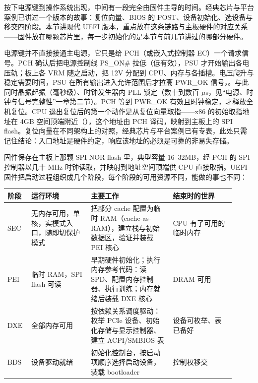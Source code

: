 
按下电源键到操作系统出现，中间有一段完全由固件主导的时间。经典芯片与平台案例已讲过一个版本的故事：复位向量、BIOS 的 POST、设备初始化、选设备与移交四阶段。本节讲现代 UEFI 版本，重点放在这条链路与主板硬件的对应关系——固件放在哪颗芯片里，每一步初始化的是本节与前几节讲过的哪部分硬件。


电源键并不直接接通主电源，它只是给 PCH（或嵌入式控制器 EC）一个请求信号。PCH 确认后把电源控制线 PS\_ON\# 拉低（低有效），PSU 才开始输出各电压轨；板上各 VRM 随之启动，把 12V 分配到 CPU、内存与各插槽。电压爬升与稳定需要时间，PSU 在所有输出进入允许范围后才拉高 PWR\_OK 信号，。与此同时晶振起振（毫秒级）、时钟发生器内 PLL 锁定（数十到数百 $\mu$s，见“电源、时钟与信号完整性”一章第二节）。PCH 等到 PWR\_OK 有效且时钟稳定，才释放全机复位。CPU 退出复位后的第一个动作是从复位向量取指——x86 的初始取指地址在 4GB 空间顶端附近（），这个地址由 PCH 译码，映射到主板上的 SPI flash。复位向量在不同架构上的对照，经典芯片与平台案例已有专表，此处只需记住结论：入口地址是硬件约定，响应该地址的必须是可靠的非易失存储。


固件保存在主板上那颗 SPI NOR flash 里，典型容量 16--32MB，经 PCH 的 SPI 控制器以几十 MHz 时钟读取，并映射到地址空间顶端供 CPU 直接取指。UEFI 固件把启动过程组织成几个阶段，每个阶段的可用资源不同，能做的事也不同：

\begin{longtable}{L{0.09\linewidth}L{0.24\linewidth}L{0.33\linewidth}L{0.25\linewidth}}
\toprule
阶段 & 运行环境 & 主要工作 & 结束时的世界 \\
\midrule
SEC & 无内存可用，单核，实模式入口，随即切保护模式 & 把部分 cache 配置为临时 RAM（cache-as-RAM），建立栈与初始数据区，验证并装载 PEI 核心 & CPU 有了可用的临时内存 \\\tablerowrule
PEI & 临时 RAM，SPI flash 可读 & 早期硬件初始化；执行内存参考代码：读 SPD、配置内存控制器、执行训练；内存就绪后装载 DXE 核心 & DRAM 可用 \\\tablerowrule
DXE & 全部内存可用 & 按依赖关系调度驱动：枚举 PCIe 设备、初始化存储与显示控制器、建立 ACPI/SMBIOS 表 & 设备可枚举、表已备好 \\\tablerowrule
BDS & 设备驱动就绪 & 初始化控制台，按启动项顺序选择启动设备，装载 bootloader & 控制权移交 \\
\bottomrule
\end{longtable}

